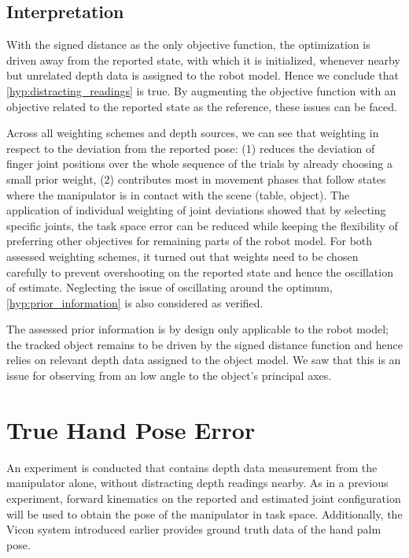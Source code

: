 \subsection{Interpretation}

With the signed distance as the only objective function, the optimization is driven away from the reported state, with which it is initialized, whenever nearby but unrelated depth data is assigned to the robot model. Hence we conclude that \cref{hyp:distracting_readings} is true. By augmenting the objective function with an objective related to the reported state as the reference, these issues can be faced.

Across all weighting schemes and depth sources, we can see that weighting in respect to the deviation from the reported pose: (1) reduces the deviation of finger joint positions over the whole sequence of the trials by already choosing a small prior weight, (2) contributes most in movement phases that follow states where the manipulator is in contact with the scene (table, object). The application of individual weighting of joint deviations showed that by selecting specific joints, the task space error can be reduced while keeping the flexibility of preferring other objectives for remaining parts of the robot model. For both assessed weighting schemes, it turned out that weights need to be chosen carefully to prevent overshooting on the reported state and hence the oscillation of estimate. Neglecting the issue of oscillating around the optimum, \cref{hyp:prior_information} is also considered as verified.

The assessed prior information is by design only applicable to the robot model; the tracked object remains to be driven by the signed distance function and hence relies on relevant depth data assigned to the object model. We saw that this is an issue for observing from an low angle to the object's principal axes.


\section{True Hand Pose Error}

An experiment is conducted that contains depth data measurement from the manipulator alone, without distracting depth readings nearby. As in a previous experiment, forward kinematics on the reported and estimated joint configuration will be used to obtain the pose of the manipulator in task space. Additionally, the Vicon system introduced earlier provides ground truth data of the hand palm pose.


